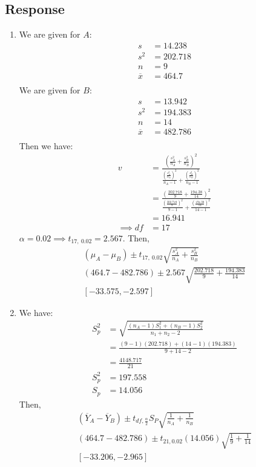 \documentclass[13pt]{article}
\begin{document}
\subsection*{Response}
\begin{enumerate}[label=(\alph*)]
\item
  We are given for $A$:
  \begin{align*}
    s &= 14.238 \\
    s^2 &= 202.718 \\
    n &= 9 \\
    \overline{x} &= 464.7 \\
  \end{align*}
  We are given for $B$:
  \begin{align*}
    s &= 13.942 \\
    s^2 &= 194.383 \\
    n &= 14 \\
    \overline{x} &= 482.786 \\
  \end{align*}
  Then we have:
  \begin{align*}
    v &= \frac{\left( \frac{s_A^2}{n_A} + \frac{s_B^2}{n_B} \right)^2}
        {\frac{ \left( \frac{s_A^2}{n_A} \right)^2 }{n_A - 1} + \frac{ \left( \frac{s_B^2}{n_B} \right)^2 }{n_B - 1}} \\
      &= \frac{\left( \frac{202.718}{9} + \frac{194.38}{14} \right)^2}
        {\frac{ \left( \frac{202.718}{9} \right)^2 }{9 - 1} + \frac{ \left( \frac{194.38}{14} \right)^2 }{14 - 1}} \\
      &= 16.941 \\
    \implies df &= 17
  \end{align*}
  $\alpha = 0.02 \implies t_{17, \ 0.02} = 2.567$. Then,
  \begin{align*}
    (\mu_A - \mu_B) \pm t_{17, \ 0.02} \sqrt{\frac{s_A^2}{n_A} + \frac{s_B^2}{n_B}} \\
    (464.7 - 482.786) \pm 2.567 \sqrt{\frac{202.718}{9} + \frac{194.383}{14}} \\
    [-33.575, -2.597]
  \end{align*}
  
\newpage  
\item
  We have:
  \begin{align*}
    S_p^2 &= \sqrt{\frac{(n_A - 1)S_1^2 + (n_B - 1)S_2^2}{n_1 + n_2 - 2}} \\
          &= \frac{(9 - 1)(202.718) + (14 - 1)(194.383)}{9 + 14 - 2} \\
          &= \frac{4148.717}{21} \\
    S_p^2 &= 197.558 \\
    S_p &= 14.056
  \end{align*}
  Then, 
  \begin{align*}
    \left( \overline{Y}_A - \overline{Y}_B \right) \pm t_{df, \frac{\alpha}{2}}S_P\sqrt{\frac{1}{n_A} + \frac{1}{n_B}} \\
    (464.7 - 482.786) \pm t_{21, 0.02} (14.056) \sqrt{\frac{1}{9} + \frac{1}{14}} \\
    [-33.206, -2.965]
  \end{align*}
\end{enumerate}
\end{document}
